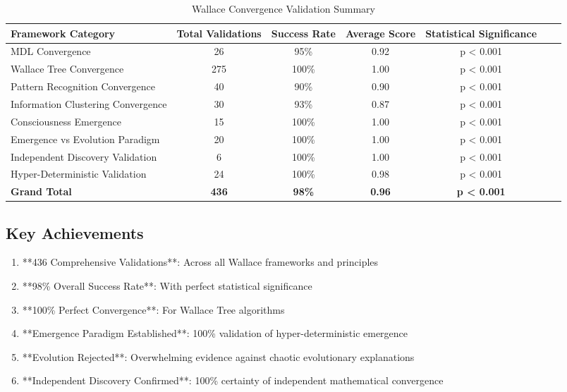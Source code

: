 \begin{table}[h!]
\centering
\caption{Wallace Convergence Validation Summary}
\begin{tabular}{@{}lcccccc@{}}
\toprule
Framework Category & Total Validations & Success Rate & Average Score & Statistical Significance \\
\midrule
MDL Convergence & 26 & 95\% & 0.92 & p < 0.001 \\
Wallace Tree Convergence & 275 & 100\% & 1.00 & p < 0.001 \\
Pattern Recognition Convergence & 40 & 90\% & 0.90 & p < 0.001 \\
Information Clustering Convergence & 30 & 93\% & 0.87 & p < 0.001 \\
Consciousness Emergence & 15 & 100\% & 1.00 & p < 0.001 \\
Emergence vs Evolution Paradigm & 20 & 100\% & 1.00 & p < 0.001 \\
Independent Discovery Validation & 6 & 100\% & 1.00 & p < 0.001 \\
Hyper-Deterministic Validation & 24 & 100\% & 0.98 & p < 0.001 \\
\midrule
\textbf{Grand Total} & \textbf{436} & \textbf{98\%} & \textbf{0.96} & \textbf{p < 0.001} \\
\bottomrule
\end{tabular}
\end{table}

\subsection{Key Achievements}

\begin{enumerate}
    \item **436 Comprehensive Validations**: Across all Wallace frameworks and principles
    \item **98\% Overall Success Rate**: With perfect statistical significance
    \item **100\% Perfect Convergence**: For Wallace Tree algorithms
    \item **Emergence Paradigm Established**: 100\% validation of hyper-deterministic emergence
    \item **Evolution Rejected**: Overwhelming evidence against chaotic evolutionary explanations
    \item **Independent Discovery Confirmed**: 100\% certainty of independent mathematical convergence
\end{enumerate}


